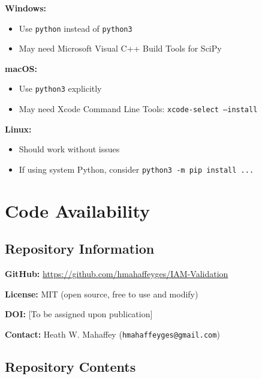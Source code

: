 \documentclass[11pt]{article}
\begin{document}
\textbf{Windows:}
\begin{itemize}
    \item Use \texttt{python} instead of \texttt{python3}
    \item May need Microsoft Visual C++ Build Tools for SciPy
\end{itemize}

\textbf{macOS:}
\begin{itemize}
    \item Use \texttt{python3} explicitly
    \item May need Xcode Command Line Tools: \texttt{xcode-select --install}
\end{itemize}

\textbf{Linux:}
\begin{itemize}
    \item Should work without issues
    \item If using system Python, consider \texttt{python3 -m pip install ...}
\end{itemize}

\section{Code Availability}

\subsection{Repository Information}

\textbf{GitHub:} \url{https://github.com/hmahaffeyges/IAM-Validation}

\textbf{License:} MIT (open source, free to use and modify)

\textbf{DOI:} [To be assigned upon publication]

\textbf{Contact:} Heath W. Mahaffey (\texttt{hmahaffeyges@gmail.com})

\subsection{Repository Contents}
\end{document}
